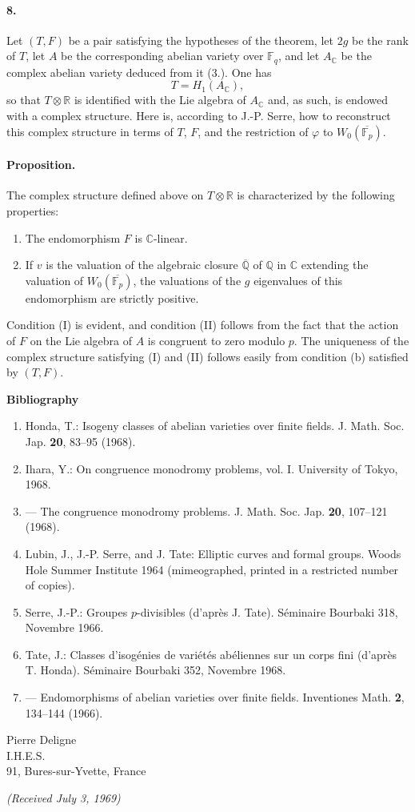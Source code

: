 \documentclass[10pt]{article}
\newcommand{\C}{\mathbb C}
\newcommand{\Fp}{\mathbb F_p}
\newcommand{\Fq}{\mathbb F_q}
\newcommand{\Q}{\mathbb Q}
\newcommand{\R}{\mathbb R}
\newcommand{\Ac}{A_{\C}}
\begin{document}
\paragraph{8.} Let $(T,F)$ be a pair satisfying the hypotheses of the theorem, let $2g$ be the rank of $T$, let $A$ be the corresponding abelian variety over $\Fq$, and let $\Ac$ be the complex abelian variety deduced from it (3.). One has
\[
T=H_1(\Ac),
\]
so that $T\otimes\R$ is identified with the Lie algebra of $\Ac$ and, as such, is endowed with a complex structure. Here is, according to J.-P. Serre, how to reconstruct this complex structure in terms of $T$, $F$, and the restriction of $\varphi$ to $W_0(\overline{\Fp})$.

\paragraph{Proposition.} The complex structure defined above on $T\otimes\R$ is characterized by the following properties:
\begin{enumerate}[label=(\Roman*)]
\item The endomorphism $F$ is $\C$-linear.
\item If $v$ is the valuation of the algebraic closure $\overline{\Q}$ of $\Q$ in $\C$ extending the valuation of $W_0(\overline{\Fp})$, the valuations of the $g$ eigenvalues of this endomorphism are strictly positive.
\end{enumerate}
Condition (I) is evident, and condition (II) follows from the fact that the action of $F$ on the Lie algebra of $A$ is congruent to zero modulo $p$. The uniqueness of the complex structure satisfying (I) and (II) follows easily from condition (b) satisfied by $(T,F)$.

\begin{center}
\bfseries Bibliography
\end{center}

\begin{enumerate}[label=\arabic*.,leftmargin=2.4em]
\item Honda, T.: Isogeny classes of abelian varieties over finite fields. J. Math. Soc. Jap. \textbf{20}, 83--95 (1968).
\item Ihara, Y.: On congruence monodromy problems, vol. I. University of Tokyo, 1968.
\item --- The congruence monodromy problems. J. Math. Soc. Jap. \textbf{20}, 107--121 (1968).
\item Lubin, J., J.-P. Serre, and J. Tate: Elliptic curves and formal groups. Woods Hole Summer Institute 1964 (mimeographed, printed in a restricted number of copies).
\item Serre, J.-P.: Groupes $p$-divisibles (d'après J. Tate). Séminaire Bourbaki 318, Novembre 1966.
\item Tate, J.: Classes d'isogénies de variétés abéliennes sur un corps fini (d'après T. Honda). Séminaire Bourbaki 352, Novembre 1968.
\item --- Endomorphisms of abelian varieties over finite fields. Inventiones Math. \textbf{2}, 134--144 (1966).
\end{enumerate}

\begin{flushright}
Pierre Deligne\\
I.H.E.S.\\
91, Bures-sur-Yvette, France
\end{flushright}

\begin{center}
\emph{(Received July 3, 1969)}
\end{center}
\end{document}
